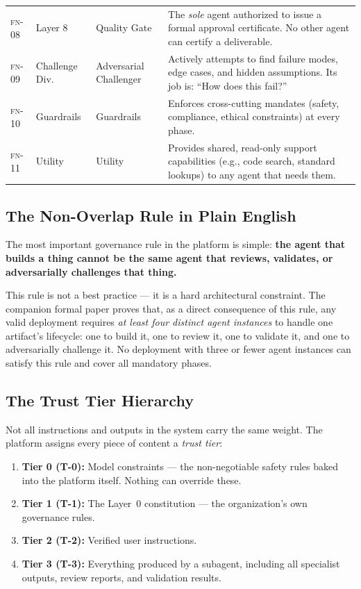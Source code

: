 \documentclass[12pt]{article}
\newcommand{\FN}[1]{\textsc{fn-#1}}
\begin{document}
\begin{table}[H]
\begin{tabular}{@{}lllp{7cm}@{}}
\FN{08} & Layer 8 & Quality Gate &
  The \emph{sole} agent authorized to issue a formal approval
  certificate.  No other agent can certify a deliverable. \\
\FN{09} & Challenge Div. & Adversarial Challenger &
  Actively attempts to find failure modes, edge cases, and
  hidden assumptions.  Its job is: ``How does this fail?'' \\
\FN{10} & Guardrails & Guardrails &
  Enforces cross-cutting mandates (safety, compliance, ethical
  constraints) at every phase. \\
\FN{11} & Utility & Utility &
  Provides shared, read-only support capabilities (e.g., code
  search, standard lookups) to any agent that needs them. \\
\bottomrule
\end{tabular}
\end{table}

\subsection{The Non-Overlap Rule in Plain English}

The most important governance rule in the platform is simple:
\textbf{the agent that builds a thing cannot be the same agent that
reviews, validates, or adversarially challenges that thing.}

This rule is not a best practice --- it is a hard architectural
constraint.
The companion formal paper proves that, as a direct consequence of
this rule, any valid deployment requires \emph{at least four distinct
agent instances} to handle one artifact's lifecycle:
one to build it, one to review it, one to validate it, and one to
adversarially challenge it.
No deployment with three or fewer agent instances can satisfy this
rule and cover all mandatory phases.

\subsection{The Trust Tier Hierarchy}

Not all instructions and outputs in the system carry the same weight.
The platform assigns every piece of content a \emph{trust tier}:

\begin{enumerate}
    \item \textbf{Tier 0 (T-0):} Model constraints --- the
          non-negotiable safety rules baked into the platform itself.
          Nothing can override these.
    \item \textbf{Tier 1 (T-1):} The Layer~0 constitution --- the
          organization's own governance rules.
    \item \textbf{Tier 2 (T-2):} Verified user instructions.
    \item \textbf{Tier 3 (T-3):} Everything produced by a subagent,
          including all specialist outputs, review reports, and
          validation results.
\end{enumerate}
\end{document}
